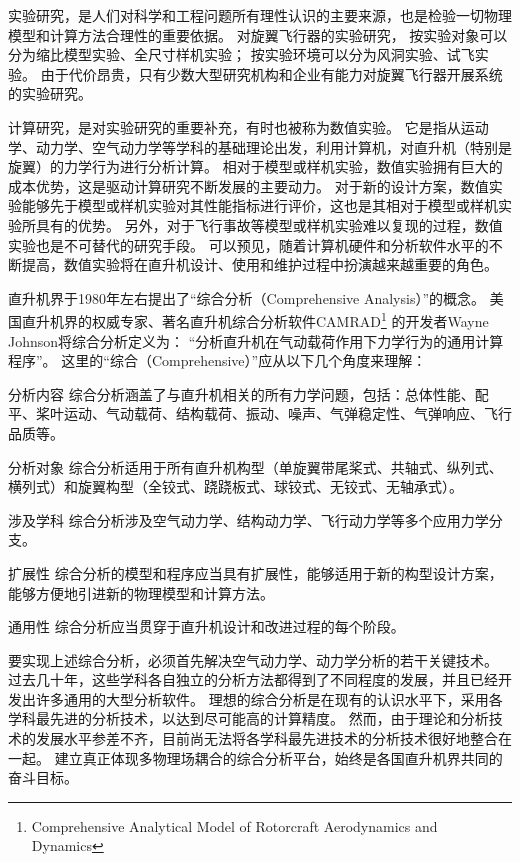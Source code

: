 实验研究，是人们对科学和工程问题所有理性认识的主要来源，也是检验一切物理模型和计算方法合理性的重要依据。
对旋翼飞行器的实验研究，
按实验对象可以分为缩比模型实验、全尺寸样机实验；
按实验环境可以分为风洞实验、试飞实验。
由于代价昂贵，只有少数大型研究机构和企业有能力对旋翼飞行器开展系统的实验研究。

计算研究，是对实验研究的重要补充，有时也被称为数值实验。
它是指从运动学、动力学、空气动力学等学科的基础理论出发，利用计算机，对直升机（特别是旋翼）的力学行为进行分析计算。
相对于模型或样机实验，数值实验拥有巨大的成本优势，这是驱动计算研究不断发展的主要动力。
对于新的设计方案，数值实验能够先于模型或样机实验对其性能指标进行评价，这也是其相对于模型或样机实验所具有的优势。
另外，对于飞行事故等模型或样机实验难以复现的过程，数值实验也是不可替代的研究手段。
可以预见，随着计算机硬件和分析软件水平的不断提高，数值实验将在直升机设计、使用和维护过程中扮演越来越重要的角色。

直升机界于1980年左右提出了“综合分析（Comprehensive Analysis）”的概念。
美国直升机界的权威专家、著名直升机综合分析软件CAMRAD\footnote{Comprehensive Analytical Model of Rotorcraft Aerodynamics and Dynamics}
的开发者Wayne Johnson将综合分析定义为：
“分析直升机在气动载荷作用下力学行为的通用计算程序”。
这里的“综合（Comprehensive）”应从以下几个角度来理解：
\begin{compactdesc}
  \item[分析内容]
  综合分析涵盖了与直升机相关的所有力学问题，包括：总体性能、配平、桨叶运动、气动载荷、结构载荷、振动、噪声、气弹稳定性、气弹响应、飞行品质等。
  \item[分析对象]
  综合分析适用于所有直升机构型（单旋翼带尾桨式、共轴式、纵列式、横列式）和旋翼构型（全铰式、跷跷板式、球铰式、无铰式、无轴承式）。
  \item[涉及学科]
  综合分析涉及空气动力学、结构动力学、飞行动力学等多个应用力学分支。
  \item[扩展性]
  综合分析的模型和程序应当具有扩展性，能够适用于新的构型设计方案，能够方便地引进新的物理模型和计算方法。
  \item[通用性]
  综合分析应当贯穿于直升机设计和改进过程的每个阶段。
\end{compactdesc}

要实现上述综合分析，必须首先解决空气动力学、动力学分析的若干关键技术。
过去几十年，这些学科各自独立的分析方法都得到了不同程度的发展，并且已经开发出许多通用的大型分析软件。
理想的综合分析是在现有的认识水平下，采用各学科最先进的分析技术，以达到尽可能高的计算精度。
然而，由于理论和分析技术的发展水平参差不齐，目前尚无法将各学科最先进技术的分析技术很好地整合在一起。
建立真正体现多物理场耦合的综合分析平台，始终是各国直升机界共同的奋斗目标。

